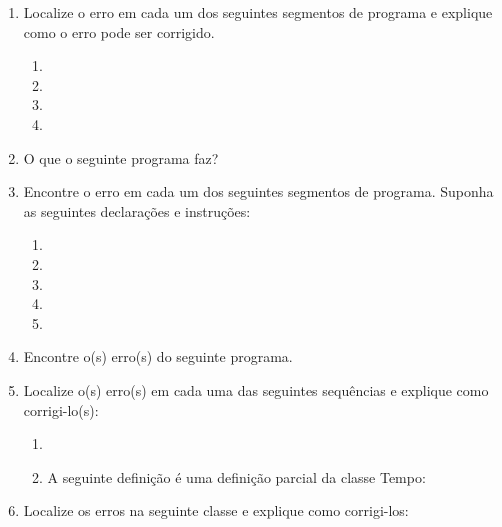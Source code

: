 \documentclass[fleqn]{article}
\begin{document}
\begin{enumerate}

    \item{
      Localize o erro em cada um dos seguintes segmentos de programa e explique como o erro pode ser corrigido.
      \begin{enumerate}
        \item{
          
        }
        \item{
          
        }
        \item{
          
        }
        \item{
          
        }
      \end{enumerate}
    }

    \item{
      O que o seguinte programa faz?
      
    }

    \item{
      Encontre o erro em cada um dos seguintes segmentos de programa. Suponha as seguintes declarações e instruções:
      
      \begin{enumerate}
        \item{
          
        }
        \item{
          
        }
        \item{
          
        }
        \item{
          
        }
        \item{
          
        }
     \end{enumerate}
    }

    \item{
      Encontre o(s) erro(s) do seguinte programa.
      
    }

    \item{
      Localize o(s) erro(s) em cada uma das seguintes sequências e explique como corrigi-lo(s):
      \begin{enumerate}
        \item{}
        \item{A seguinte definição é uma definição parcial da classe Tempo: }
      \end{enumerate}
    }

    \item{
      Localize os erros na seguinte classe e explique como corrigi-los:
      
    }

\end{enumerate}
\end{document}
